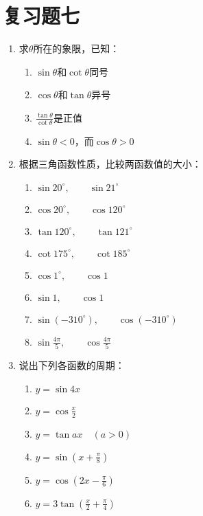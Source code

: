 \section*{复习题七}
\begin{enumerate}
    \item 求$\theta$所在的象限，已知：
\begin{multicols}{2}
\begin{enumerate}
    \item $\sin\theta$和$\cot \theta$同号
    \item $\cos\theta$和$\tan \theta$异号
    \item $\frac{\tan\theta}{\cot\theta}$是正值
    \item $\sin\theta <0$，而$\cos\theta>0$
\end{enumerate}
\end{multicols}
\item 根据三角函数性质，比较两函数值的大小：
\begin{multicols}{2}
    \begin{enumerate}
        \item $\sin 20^{\circ},\qquad \sin 21^{\circ}$
        \item $\cos 20^{\circ},\qquad \cos 120^{\circ}$
        \item $\tan 120^{\circ},\qquad \tan 121^{\circ}$
        \item $\cot175^{\circ},\qquad \cot 185^{\circ}$
        \item $\cos 1^{\circ},\qquad \cos 1$
        \item $\sin 1,\qquad \cos 1$
        \item $\sin(-310^{\circ}),\qquad \cos(-310^{\circ})$
        \item $\sin\frac{4\pi}{5},\qquad \cos\frac{4\pi}{5}$
    \end{enumerate}
    \end{multicols}


\item 说出下列各函数的周期：
\begin{multicols}{2}
\begin{enumerate}
    \item $y=\sin 4x$
    \item $y=\cos\frac{x}{2}$
    \item $y=\tan ax \quad (a>0)$
    \item $y=\sin\left(x+\frac{\pi}{8}\right)$
    \item $y=\cos\left(2x-\frac{\pi}{6}\right)$
    \item $y=3\tan\left(\frac{x}{2}+\frac{\pi}{4}\right)$
\end{enumerate}
\end{multicols}


\end{enumerate}
